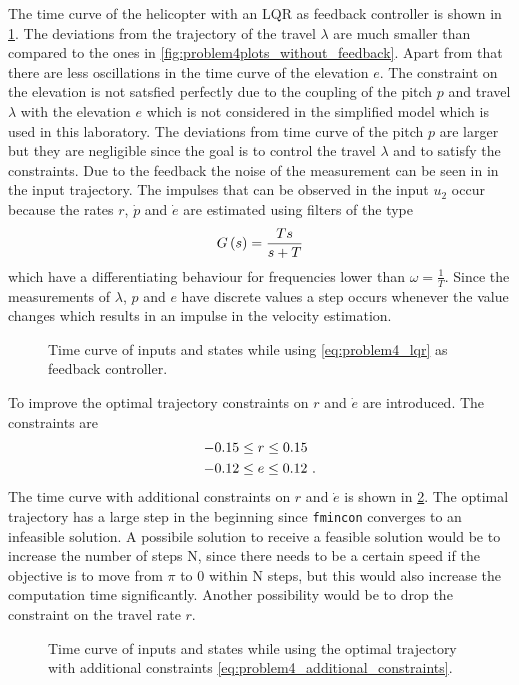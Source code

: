 The time curve of the helicopter with an LQR as feedback controller is shown in \cref{fig:problem4plot_511111_11}. The deviations from the trajectory of the travel $\lambda$ are much smaller than compared to the ones in \cref{fig:problem4plots_without_feedback}. Apart from that there are less oscillations in the time curve of the elevation $e$. The constraint on the elevation is not satsfied perfectly due to the coupling of the pitch $p$ and travel $\lambda$ with the elevation $e$ which is not considered in the simplified model which is used in this laboratory. The deviations from time curve of the pitch $p$ are larger but they are negligible since the goal is to control the travel $\lambda$ and to satisfy the constraints. Due to the feedback the noise of the measurement can be seen in in the input trajectory. The impulses that can be observed in the input $u_2$ occur because the rates $r$, $\dot{p}$ and $\dot{e}$ are estimated using filters of the type 
\begin{equation}
G\left(s\right)=\frac{Ts}{s+T}
\end{equation}
which have a differentiating behaviour for frequencies lower than $\omega=\frac{1}{T}$. Since the measurements of $\lambda$, $p$ and $e$ have discrete values a step occurs whenever the value changes which results in an impulse in the velocity estimation.

\begin{figure}[htbp]
	\centering
	\caption{Time curve of inputs and states while using \eqref{eq:problem4_lqr} as feedback controller.}
	\label{fig:problem4plot_511111_11}%
\end{figure}

To improve the optimal trajectory constraints on $r$ and $\dot{e}$ are introduced. The constraints are
\begin{subequations}
	\begin{align}
	-0.15&\leq r\leq0.15\\
	-0.12&\leq e\leq0.12\FullStop
	\end{align}
	\label{eq:problem4_additional_constraints}%
\end{subequations}
The time curve with additional constraints on $r$ and $\dot{e}$ is shown in \cref{fig:LQR_bothconstraintsN=60}. The optimal trajectory has a large step in the beginning since \verb|fmincon| converges to an infeasible solution. A possibile solution to receive a feasible solution would be to increase the number of steps N, since there needs to be a certain speed if the objective is to move from $\pi$ to 0 within N steps, but this would also increase the computation time significantly. Another possibility would be to drop the constraint on the travel rate $r$. 

\begin{figure}[htbp]
	\centering
	\caption{Time curve of inputs and states while using the optimal trajectory with additional constraints \eqref{eq:problem4_additional_constraints}.}
	\label{fig:LQR_bothconstraintsN=60}%
\end{figure}


